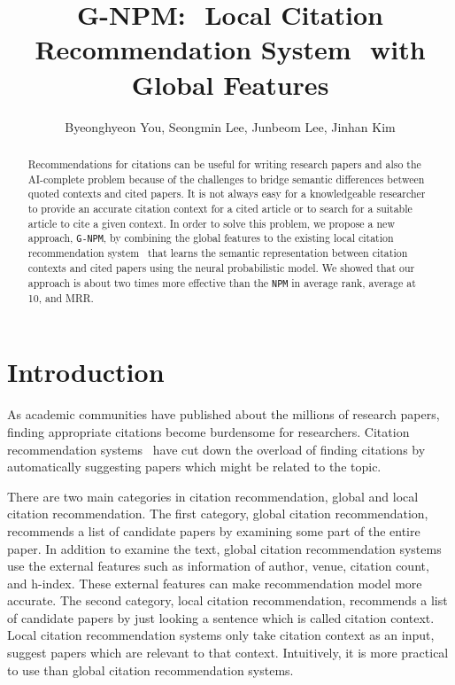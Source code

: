 \documentclass{llncs}
\newcommand{\name}{\texttt{G-NPM}\xspace}
\newcommand{\npm}{\texttt{NPM}\xspace}
\begin{document}
\title{G-NPM:  Local Citation Recommendation System  with Global Features}

\author{Byeonghyeon You, Seongmin Lee, Junbeom Lee, Jinhan Kim}


\maketitle

\begin{abstract}
Recommendations for citations can be useful for writing research papers and also the AI-complete problem because of the challenges to bridge semantic differences between quoted contexts and cited papers.
It is not always easy for a knowledgeable researcher to provide an accurate citation context for a cited article or to search for a suitable article to cite a given context.
In order to solve this problem, we propose a new approach, \name, by combining the global features to the existing local citation recommendation system~\cite{Huang:2015:NPM:2886521.2886655} that learns the semantic representation between citation contexts and cited papers using the neural probabilistic model. We showed that our approach is about two times more effective than the \npm in average rank, average at 10, and MRR.

\end{abstract}

\section{Introduction}
\label{sec:introduction}
As academic communities have published about the millions of research papers, finding appropriate citations become burdensome for researchers. Citation recommendation systems~\cite{ren2014cluscite,Huang:2015:NPM:2886521.2886655,Bethard:2010:ICL:1871437.1871517} have cut down the overload of finding citations by automatically suggesting papers which might be related to the topic.


There are two main categories in citation recommendation, global and local citation recommendation.
The first category, global citation recommendation, recommends a list of candidate papers by examining some part of the entire paper. In addition to examine the text, global citation recommendation systems use the external features such as information of author, venue, citation count, and h-index. These external features can make recommendation model more accurate.
The second category, local citation recommendation, recommends a list of candidate papers by just looking a sentence which is called citation context. Local citation recommendation systems only take citation context as an input, suggest papers which are relevant to that context. Intuitively, it is more practical to use than global citation recommendation systems.
\end{document}
